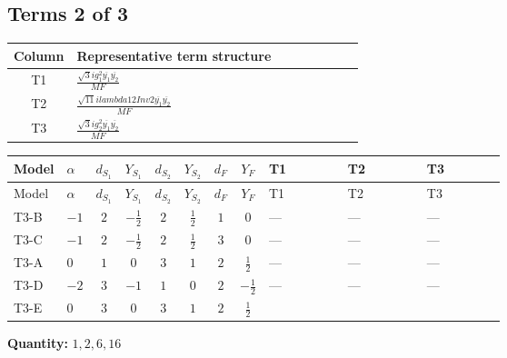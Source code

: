\documentclass[8pt]{article}
\begin{document}
\begin{landscape}
\subsection*{Terms 2 of 3}
\begin{center}
\begin{tabular}{@{}c >{\raggedright\arraybackslash}p{0.82\linewidth}@{}}
\toprule
Column & Representative term structure \\
\midrule
T1 & \(\displaystyle \frac{\sqrt{3} i g_{1}^{2} \overline{y_{1}} \overline{y_{2}}}{MF}\) \\
\midrule
T2 & \(\displaystyle \frac{\sqrt{11} i lambda12Inv2 \overline{y_{1}} \overline{y_{2}}}{MF}\) \\
\midrule
T3 & \(\displaystyle \frac{\sqrt{3} i g_{2}^{2} \overline{y_{1}} \overline{y_{2}}}{MF}\) \\
\midrule
\bottomrule
\end{tabular}
\end{center}
\smallskip
\tiny
\begin{longtable}{@{}llcccccc >{\raggedright\arraybackslash}p{0.21\linewidth} >{\raggedright\arraybackslash}p{0.21\linewidth} >{\raggedright\arraybackslash}p{0.21\linewidth}@{}}
\toprule
Model & $\alpha$ & $d_{S_1}$ & $Y_{S_1}$ & $d_{S_2}$ & $Y_{S_2}$ & $d_F$ & $Y_F$ & T1 & T2 & T3 \\
\midrule
\endfirsthead
\toprule
Model & $\alpha$ & $d_{S_1}$ & $Y_{S_1}$ & $d_{S_2}$ & $Y_{S_2}$ & $d_F$ & $Y_F$ & T1 & T2 & T3 \\
\midrule
\endhead
T3-B & $-1$ & $2$ & $-\frac{1}{2}$ & $2$ & $\frac{1}{2}$ & $1$ & $0$ & --- & --- & --- \\
\midrule
T3-C & $-1$ & $2$ & $-\frac{1}{2}$ & $2$ & $\frac{1}{2}$ & $3$ & $0$ & --- & --- & --- \\
\midrule
T3-A & $0$ & $1$ & $0$ & $3$ & $1$ & $2$ & $\frac{1}{2}$ & --- & --- & --- \\
\midrule
T3-D & $-2$ & $3$ & $-1$ & $1$ & $0$ & $2$ & $-\frac{1}{2}$ & --- & --- & --- \\
\midrule
T3-E & $0$ & $3$ & $0$ & $3$ & $1$ & $2$ & $\frac{1}{2}$ & \scriptsize\adjustbox{max width=\linewidth}{$\begin{gathered} \frac{\sqrt{3} i g_{1}^{2} \overline{y_{1}} \overline{y_{2}}}{8 MF}\end{gathered}$} & \scriptsize\adjustbox{max width=\linewidth}{$\begin{gathered} \frac{3 \sqrt{11} i lambda12Inv2 \overline{y_{1}} \overline{y_{2}}}{22 MF}\end{gathered}$} & \scriptsize\adjustbox{max width=\linewidth}{$\begin{gathered} \frac{15 \sqrt{3} i g_{2}^{2} \overline{y_{1}} \overline{y_{2}}}{8 MF}\end{gathered}$} \\
\midrule
\bottomrule
\end{longtable}
\clearpage
\noindent\textbf{Quantity: }$\mathrm{1,2,6,16}$\par\smallskip

\end{landscape}
\end{document}
